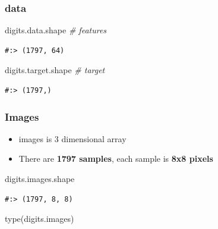 \documentclass[
]{book}
\newenvironment{Shaded}{\begin{snugshade}}{\end{snugshade}}
\newcommand{\BuiltInTok}[1]{#1}
\newcommand{\CommentTok}[1]{\textcolor[rgb]{0.37,0.37,0.37}{\textit{#1}}}
\newcommand{\NormalTok}[1]{#1}
\providecommand{\tightlist}{%
  \setlength{\itemsep}{0pt}\setlength{\parskip}{0pt}}
\begin{document}
\hypertarget{data}{%
\subsubsection{data}\label{data}}

\begin{Shaded}
\begin{Highlighting}[]
\NormalTok{digits.data.shape  }\CommentTok{# features}
\end{Highlighting}
\end{Shaded}

\begin{verbatim}
#:> (1797, 64)
\end{verbatim}

\begin{Shaded}
\begin{Highlighting}[]
\NormalTok{digits.target.shape }\CommentTok{# target}
\end{Highlighting}
\end{Shaded}

\begin{verbatim}
#:> (1797,)
\end{verbatim}

\hypertarget{images}{%
\subsubsection{Images}\label{images}}

\begin{itemize}
\tightlist
\item
  images is 3 dimensional array\\
\item
  There are \textbf{1797 samples}, each sample is \textbf{8x8 pixels}
\end{itemize}

\begin{Shaded}
\begin{Highlighting}[]
\NormalTok{digits.images.shape}
\end{Highlighting}
\end{Shaded}

\begin{verbatim}
#:> (1797, 8, 8)
\end{verbatim}

\begin{Shaded}
\begin{Highlighting}[]
\BuiltInTok{type}\NormalTok{(digits.images)}
\end{Highlighting}
\end{Shaded}
\end{document}
